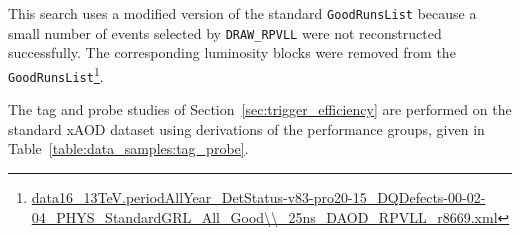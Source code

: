 \begin{table}[!htb]
  \centering
  \caption{Dataset used in \texttt{DRAW\_RPVLL}, \texttt{DAOD\_RPVLL}, and \texttt{DAOD\_SUSY15} format.}
  \label{table:data_samples}
\end{table}

This search uses a modified version of the standard \texttt{GoodRunsList} because a small number of events selected by \texttt{DRAW\_RPVLL} were not reconstructed successfully. The corresponding luminosity blocks were removed from the \texttt{GoodRunsList}\footnote{\url{data16\_13TeV.periodAllYear\_DetStatus-v83-pro20-15\_DQDefects-00-02-04\_PHYS\_StandardGRL\_All\_Good\\\_25ns\_DAOD\_RPVLL\_r8669.xml}}.


The tag and probe studies of Section~\ref{sec:trigger_efficiency} are performed on the standard xAOD dataset using derivations of the performance groups, given in Table~\ref{table:data_samples:tag_probe}.  

\begin{table}[!htb]
  \centering
  \caption{Datasets used for tag and probe studies.}
  \label{table:data_samples:tag_probe}
\end{table}



